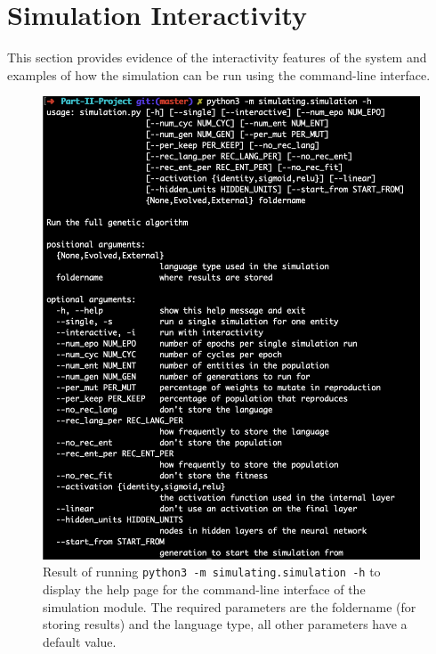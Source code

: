 \documentclass[12pt,a4paper]{report}
\begin{document}
\chapter{Simulation Interactivity}\label{chapter:simulation-interactivity}

This section provides evidence of the interactivity features of the system and examples of how the simulation can be run using the command-line interface.

\begin{figure}[t]
   \centering
   \begin{minipage}{0.49\textwidth}
          \centering
          \captionsetup{width=.9\linewidth}
          \includegraphics[width=1.\linewidth]{figs/commandline}
          \caption{Result of running \texttt{python3 -m simulating.simulation -h} to display the help page for the command-line interface of the simulation module. The required parameters are the foldername (for storing results) and the language type, all other parameters have a default value.}
      \label{fig:commandline}
   \end{minipage}

\end{figure}
\end{document}

